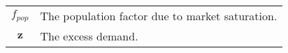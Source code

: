 \documentclass[conference]{IEEEtran}
\newcommand{\1}[1]{\mathds{1}\left[#1\right]}
\theoremstyle{plain}
\newcommand{\ie}{i.e.}
\newcommand{\problem}{NP$^3$R\xspace}
\newcommand{\homob}{Homogeneous Breeding\xspace}
\begin{document}
{\begin{table}
\begin{tabular}{c|p{.7\linewidth}}
    $f_{pop}$ & The population factor due to market saturation. \\
    $\mathbf{z}$ & The excess demand.\\
    \bottomrule
    \end{tabular}
\end{table} 
}
\end{document}
